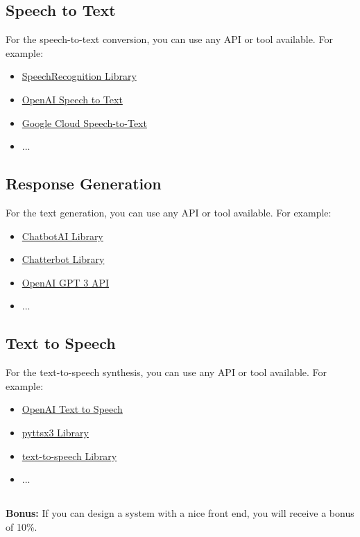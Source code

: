 \documentclass{article}
\begin{document}
\subsection*{Speech to Text}
For the speech-to-text conversion, you can use any API or tool available. For example:
\begin{itemize}
    \item \href{https://pypi.org/project/SpeechRecognition/}{SpeechRecognition Library}
    \item \href{https://platform.openai.com/docs/guides/speech-to-text}{OpenAI Speech to Text}
    \item \href{https://cloud.google.com/speech-to-text}{Google Cloud Speech-to-Text}
    \item ...
\end{itemize}

\subsection*{Response Generation}
For the text generation, you can use any API or tool available. For example:
\begin{itemize}
    \item \href{https://pypi.org/project/chatbotAI/}{ChatbotAI Library}
    \item \href{https://chatterbot.readthedocs.io/en/stable/index.html}{Chatterbot Library}
    \item \href{https://platform.openai.com/docs/api-reference}{OpenAI GPT 3 API}
    \item ...
\end{itemize}

\subsection*{Text to Speech}
For the text-to-speech synthesis, you can use any API or tool available. For example:
\begin{itemize}
    \item \href{https://platform.openai.com/docs/guides/text-to-speech}{OpenAI Text to Speech}
    \item \href{https://pypi.org/project/pyttsx3/}{pyttsx3 Library}
    \item \href{https://pypi.org/project/text-to-speech/}{text-to-speech Library}
    \item ...
\end{itemize}

\subsection*{}
\textbf{Bonus:} 
If you can design a system with a nice front end, you will receive a bonus of 10\%.
\end{document}
